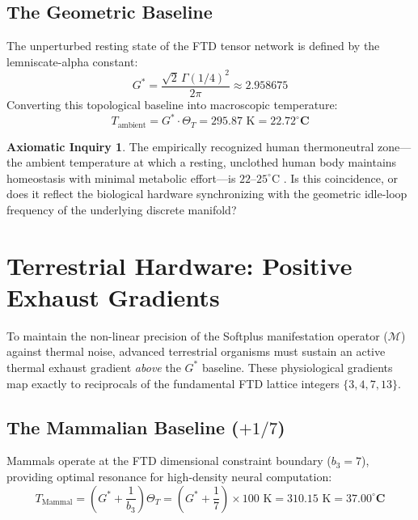 \documentclass[11pt, letterpaper]{article}
\newcommand{\G}{G^*}
\theoremstyle{definition}
\newtheorem{inquiry}{Axiomatic Inquiry}[section]
\theoremstyle{remark}
\begin{document}
\subsection{The Geometric Baseline}

The unperturbed resting state of the FTD tensor network is defined by the lemniscate-alpha constant:
\begin{equation}
    \G = \frac{\sqrt{2}\,\Gamma(1/4)^2}{2\pi} \approx 2.958675
\end{equation}
Converting this topological baseline into macroscopic temperature:
\begin{equation}
    T_{\text{ambient}} = \G \cdot \Theta_T = 295.87 \text{ K} = \mathbf{22.72^\circ\text{C}}
\end{equation}

\begin{inquiry}
The empirically recognized human thermoneutral zone---the ambient temperature at which a resting, unclothed human body maintains homeostasis with minimal metabolic effort---is $22$--$25^\circ$C \cite{ASHRAE2017}. Is this coincidence, or does it reflect the biological hardware synchronizing with the geometric idle-loop frequency of the underlying discrete manifold?
\end{inquiry}

\section{Terrestrial Hardware: Positive Exhaust Gradients}

To maintain the non-linear precision of the Softplus manifestation operator ($\mathcal{M}$) against thermal noise, advanced terrestrial organisms must sustain an active thermal exhaust gradient \textit{above} the $\G$ baseline. These physiological gradients map exactly to reciprocals of the fundamental FTD lattice integers $\{3, 4, 7, 13\}$.

\subsection{The Mammalian Baseline ($+1/7$)}

Mammals operate at the FTD dimensional constraint boundary ($b_3 = 7$), providing optimal resonance for high-density neural computation:
\begin{equation}
    T_{\text{Mammal}} = \left(\G + \frac{1}{b_3}\right)\Theta_T = \left(\G + \frac{1}{7}\right) \times 100 \text{ K} = 310.15 \text{ K} = \mathbf{37.00^\circ\text{C}}
\end{equation}
\end{document}
